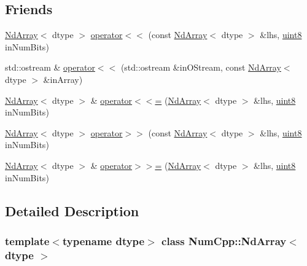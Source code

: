 \subsection*{Friends}
\begin{DoxyCompactItemize}
\item 
\mbox{\hyperlink{class_num_cpp_1_1_nd_array}{Nd\+Array}}$<$ dtype $>$ \mbox{\hyperlink{class_num_cpp_1_1_nd_array_ad870c7e142d724ed1a984e4e0998d871}{operator$<$$<$}} (const \mbox{\hyperlink{class_num_cpp_1_1_nd_array}{Nd\+Array}}$<$ dtype $>$ \&lhs, \mbox{\hyperlink{namespace_num_cpp_aee396d0469d6031cd18118c0a45bcdda}{uint8}} in\+Num\+Bits)
\item 
std\+::ostream \& \mbox{\hyperlink{class_num_cpp_1_1_nd_array_a7bc4555bca4773adf8f4e51ca73c13ed}{operator$<$$<$}} (std\+::ostream \&in\+O\+Stream, const \mbox{\hyperlink{class_num_cpp_1_1_nd_array}{Nd\+Array}}$<$ dtype $>$ \&in\+Array)
\item 
\mbox{\hyperlink{class_num_cpp_1_1_nd_array}{Nd\+Array}}$<$ dtype $>$ \& \mbox{\hyperlink{class_num_cpp_1_1_nd_array_ad35a1fb99d88618e4446403e9f77d228}{operator$<$$<$=}} (\mbox{\hyperlink{class_num_cpp_1_1_nd_array}{Nd\+Array}}$<$ dtype $>$ \&lhs, \mbox{\hyperlink{namespace_num_cpp_aee396d0469d6031cd18118c0a45bcdda}{uint8}} in\+Num\+Bits)
\item 
\mbox{\hyperlink{class_num_cpp_1_1_nd_array}{Nd\+Array}}$<$ dtype $>$ \mbox{\hyperlink{class_num_cpp_1_1_nd_array_ab15a0eab1b334b204ab5dd780c35435a}{operator$>$$>$}} (const \mbox{\hyperlink{class_num_cpp_1_1_nd_array}{Nd\+Array}}$<$ dtype $>$ \&lhs, \mbox{\hyperlink{namespace_num_cpp_aee396d0469d6031cd18118c0a45bcdda}{uint8}} in\+Num\+Bits)
\item 
\mbox{\hyperlink{class_num_cpp_1_1_nd_array}{Nd\+Array}}$<$ dtype $>$ \& \mbox{\hyperlink{class_num_cpp_1_1_nd_array_a176583bd05fbbbf2f7ef9984cac49f76}{operator$>$$>$=}} (\mbox{\hyperlink{class_num_cpp_1_1_nd_array}{Nd\+Array}}$<$ dtype $>$ \&lhs, \mbox{\hyperlink{namespace_num_cpp_aee396d0469d6031cd18118c0a45bcdda}{uint8}} in\+Num\+Bits)
\end{DoxyCompactItemize}


\subsection{Detailed Description}
\subsubsection*{template$<$typename dtype$>$\newline
class Num\+Cpp\+::\+Nd\+Array$<$ dtype $>$}

